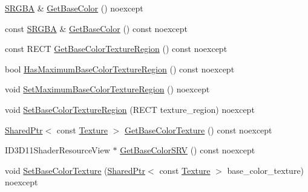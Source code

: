 \begin{DoxyCompactItemize}
\item 
\hyperlink{structmage_1_1_s_r_g_b_a}{S\+R\+G\+BA} \& \hyperlink{classmage_1_1_sprite_image_a0362a937253ba7a5cd944210aafd9288}{Get\+Base\+Color} () noexcept
\item 
const \hyperlink{structmage_1_1_s_r_g_b_a}{S\+R\+G\+BA} \& \hyperlink{classmage_1_1_sprite_image_a72e5087fc7f6bc1668980c5c35815906}{Get\+Base\+Color} () const noexcept
\item 
const R\+E\+CT \hyperlink{classmage_1_1_sprite_image_a74713ac25073002cd7425482bb474366}{Get\+Base\+Color\+Texture\+Region} () const noexcept
\item 
bool \hyperlink{classmage_1_1_sprite_image_a6d1267ebb8010e38875a717bd8339c3d}{Has\+Maximum\+Base\+Color\+Texture\+Region} () const noexcept
\item 
void \hyperlink{classmage_1_1_sprite_image_aa08a58d1e94f8e26031b97b56b0c8c6a}{Set\+Maximum\+Base\+Color\+Texture\+Region} () noexcept
\item 
void \hyperlink{classmage_1_1_sprite_image_aa68e416669d05cf777c564b118b50fe5}{Set\+Base\+Color\+Texture\+Region} (R\+E\+CT texture\+\_\+region) noexcept
\item 
\hyperlink{namespacemage_a1e01ae66713838a7a67d30e44c67703e}{Shared\+Ptr}$<$ const \hyperlink{classmage_1_1_texture}{Texture} $>$ \hyperlink{classmage_1_1_sprite_image_a7fa3f86018f033288c755a665ee90bc2}{Get\+Base\+Color\+Texture} () const noexcept
\item 
I\+D3\+D11\+Shader\+Resource\+View $\ast$ \hyperlink{classmage_1_1_sprite_image_a955225e8274ae5f39f6eb6f6fbb75638}{Get\+Base\+Color\+S\+RV} () const noexcept
\item 
void \hyperlink{classmage_1_1_sprite_image_a9fb3a39de1350e58b4019b541337ca13}{Set\+Base\+Color\+Texture} (\hyperlink{namespacemage_a1e01ae66713838a7a67d30e44c67703e}{Shared\+Ptr}$<$ const \hyperlink{classmage_1_1_texture}{Texture} $>$ base\+\_\+color\+\_\+texture) noexcept
\end{DoxyCompactItemize}
